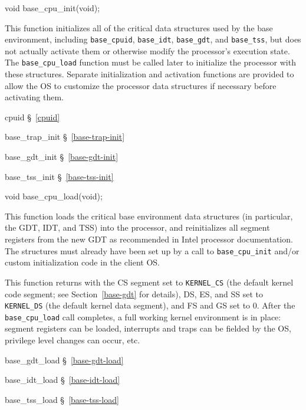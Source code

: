 \label{base-cpu-init}
\begin{apisyn}

	\funcproto void base_cpu_init(void);
\end{apisyn}
\begin{apidesc}
	This function initializes all of the critical data structures
	used by the base environment,
	including {\tt base_cpuid}, {\tt base_idt}, {\tt base_gdt},
	and {\tt base_tss},
	but does not actually activate them
	or otherwise modify the processor's execution state.
	The {\tt base_cpu_load} function must be called later
	to initialize the processor with these structures.
	Separate initialization and activation functions are provided
	to allow the OS to customize the processor data structures if necessary
	before activating them.
\end{apidesc}
\begin{apidep}
	\item[cpuid]		\S~\ref{cpuid}
	\item[base_trap_init]	\S~\ref{base-trap-init}
	\item[base_gdt_init]	\S~\ref{base-gdt-init}
	\item[base_tss_init]	\S~\ref{base-tss-init}
\end{apidep}

\label{base-cpu-load}
\begin{apisyn}

	\funcproto void base_cpu_load(void);
\end{apisyn}
\begin{apidesc}
	This function loads the critical base environment data structures
	(in particular, the GDT, IDT, and TSS)
	into the processor,
	and reinitializes all segment registers from the new GDT
	as recommended in Intel processor documentation.
	The structures must already have been set up
	by a call to {\tt base_cpu_init}
	and/or custom initialization code in the client OS.

	This function returns with the CS segment set to {\tt KERNEL_CS}
	(the default kernel code segment;
	see Section~\ref{base-gdt} for details),
	DS, ES, and SS set to {\tt KERNEL_DS}
	(the default kernel data segment),
	and FS and GS set to 0.
	After the {\tt base_cpu_load} call completes,
	a full working kernel environment is in place:
	segment registers can be loaded,
	interrupts and traps can be fielded by the OS,
	privilege level changes can occur, etc.
\end{apidesc}
\begin{apidep}
	\item[base_gdt_load]	\S~\ref{base-gdt-load}
	\item[base_idt_load]	\S~\ref{base-idt-load}
	\item[base_tss_load]	\S~\ref{base-tss-load}
\end{apidep}

